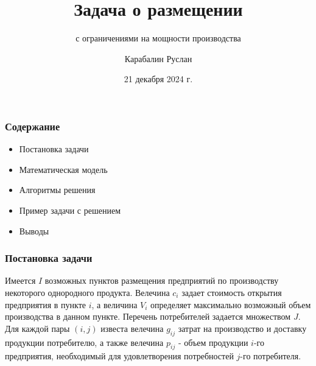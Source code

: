 \documentclass[12pt]{beamer}
\title{Задача о размещении}
\subtitle{с ограничениями на мощности производства}
\author{Карабалин Руслан}
\date{21 декабря 2024 г.}
\begin{document}
	
	\begin{frame}
		\titlepage
	\end{frame}

    \begin{frame}
        \frametitle{Содержание}

        \begin{itemize}
            \item Постановка задачи
            \item Математическая модель
            \item Алгоритмы решения
            \item Пример задачи с решением
            \item Выводы
        \end{itemize}

    \end{frame}

    \begin{frame}
        \frametitle{Постановка задачи}

        Имеется $I$ возможных пунктов размещения предприятий
        по производству некоторого однородного продукта.
        Велечина $c_{i}$ задает стоимость открытия предприятия
        в пункте $i$, а величина $V_{i}$ определяет максимально
        возможный объем производства в данном пункте.
        Перечень потребителей задается множеством $J$.
        Для каждой пары $(i, j)$ известа велечина $g_{ij}$
        затрат на производство и доставку продукции потребителю,
        а также велечина $p_{ij}$ - объем продукции $i$-го предприятия,
        необходимый для удовлетворения потребностей
        $j$-го потребителя.
        
    \end{frame}
\end{document}
